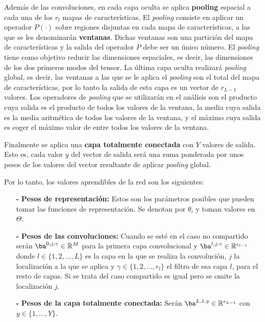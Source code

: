 Además de las convoluciones, en cada capa oculta se aplica \textbf{pooling} espacial a cada una de los $r_l$ mapas de características. El \textit{pooling} consiste en aplicar un operador $P(\cdot)$ sobre regiones disjuntas en cada mapa de características, a las que se les denominarán \textbf{ventanas}. Dichas ventanas son una partición del mapa de características y la salida del operador $P$ debe ser un único número. El \textit{pooling} tiene como objetivo reducir las dimensiones espaciales, es decir, las dimensiones de los dos primeros modos del tensor. La última capa oculta realizará \textit{pooling} global, es decir, las ventanas a las que se le aplica el \textit{pooling} son el total del mapa de características, por lo tanto la salida de esta capa es un vector de $r_{L-1}$ valores. Los operadores de \textit{pooling} que se utilizarán en el análisis son el producto cuya salida es el producto de todos los valores de la ventana, la media cuya salida es la media aritmética de todos los valores de la ventana, y el máximo cuya salida es coger el máximo valor de entre todos los valores de la ventana.

Finalmente se aplica una \textbf{capa totalmente conectada} con $Y$ valores de salida. Esto es, cada valor $y$ del vector de salida será una suma ponderada por unos pesos de los valores del vector resultante de aplicar \textit{pooling} global.

Por lo tanto, los valores aprendibles de la red son los siguientes: 

\begin{itemize}
\item[\quad \textbf{-}]\textbf{Pesos de representación:} Estos son los parámetros posibles que pueden tomar las funciones de representación. Se denotan por $\theta_i$ y toman valores en $\Theta$.
\item[\quad \textbf{-}]\textbf{Pesos de las convoluciones:} Cuando se esté en el caso no compartido serán $\ba^{0,j,\gamma}\in\mathbb{R}^{M}$ para la primera capa convolucional y $\ba^{l,j,\gamma}\in\mathbb{R}^{r_{l-1}}$ donde $l\in \{1,2,... ,L\}$ es la capa en la que se realiza la convolución, $j$ la localización a la que se aplica y $\gamma\in\{1,2,... ,r_l\}$ el filtro de esa capa $l$, para el resto de capas. Si se trata del caso compartido es igual pero se omite la localización $j$.
\item[\quad \textbf{-}]\textbf{Pesos de la capa totalmente conectada:} Serán $\ba^{L,1,y}\in\mathbb{R}^{r_{L-1}}$ con $y\in\{1,... ,Y\}$.
\end{itemize}

